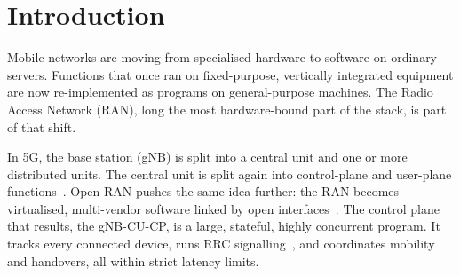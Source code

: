 \documentclass[english,oneside,a4paper,censored,csm,software-track-2020]{HYthesisML}
\begin{document}
\cleardoublepage
{}
\setcounter{page}{1}
\tableofcontents

\cleardoublepage
{}
{}
\listoffigures

\cleardoublepage
{}
{}
\listoftables

\cleardoublepage

\mainmatter

\singlespacing

\chapter{Introduction}

Mobile networks are moving from specialised hardware to software on ordinary servers.
Functions that once ran on fixed-purpose, vertically integrated equipment are now
re-implemented as programs on general-purpose machines. The Radio Access Network (RAN),
long the most hardware-bound part of the stack, is part of that shift.

In 5G, the base station (gNB) is split into a central unit and one or more distributed
units. The central unit is split again into control-plane and user-plane
functions~\cite{3gpp38401,3gpp38300}. Open-RAN pushes the same idea further: the RAN
becomes virtualised, multi-vendor software linked by open
interfaces~\cite{polese2023oran}. The control plane that results, the gNB-CU-CP, is a
large, stateful, highly concurrent program. It tracks every connected device, runs RRC
signalling~\cite{3gpp38331}, and coordinates mobility and handovers, all within strict
latency limits.
\end{document}
